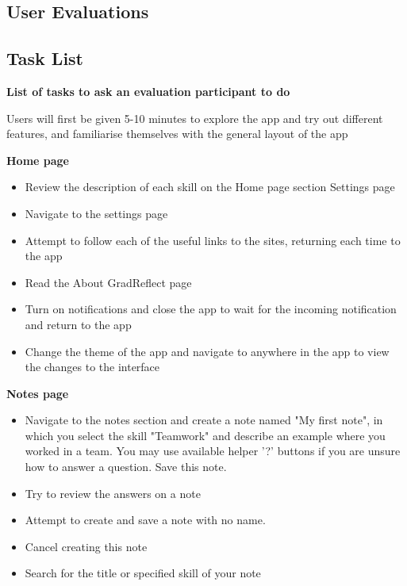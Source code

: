\documentclass{l4proj}
\begin{document}
\begin{appendices}
\section{User Evaluations} \label{Appendix-UserEvals}

\subsection{Task List} \label{Appendix-taskList}

\textbf{List of tasks to ask an evaluation participant to do}

Users will first be given 5-10 minutes to explore the app and try out different features, and familiarise themselves with the general layout of the app

\textbf{Home page}

\begin{itemize}
    \item Review the description of each skill on the Home page section Settings page
    \item Navigate to the settings page
    \item Attempt to follow each of the useful links to the sites, returning each time to the app
    \item Read the About GradReflect page
    \item Turn on notifications and close the app to wait for the incoming notification and return to the app
    \item Change the theme of the app and navigate to anywhere in the app to view the changes to the interface
\end{itemize}

\textbf{Notes page}

\begin{itemize}
    \item Navigate to the notes section and create a note named "My first note", in which you select the skill "Teamwork" and describe an example where you worked in a team. You may use available helper '?' buttons if you are unsure how to answer a question. Save this note.
    \item Try to review the answers on a note
    \item Attempt to create and save a note with no name.
    \item Cancel creating this note
    \item Search for the title or specified skill of your note
\end{itemize}


\end{appendices}
\end{document}
